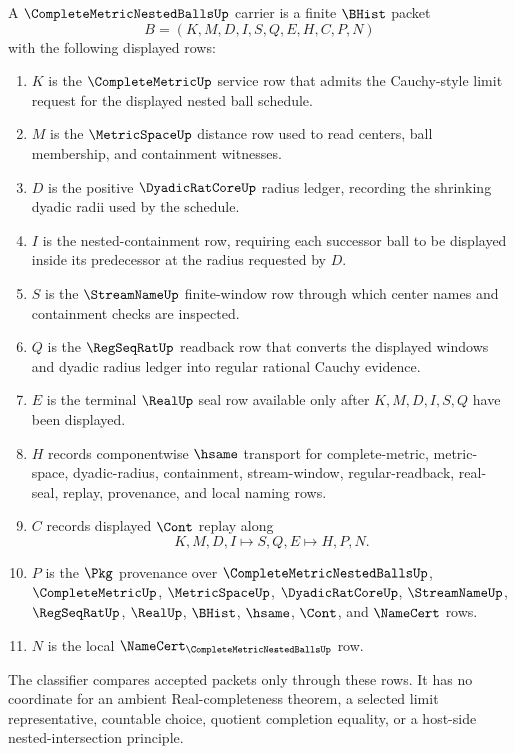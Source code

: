 \begin{definition}
\label{def:complete-metric-nested-balls-carrier}
A $\CompleteMetricNestedBallsUp$ carrier is a finite $\BHist$ packet
$$
B=(K,M,D,I,S,Q,E,H,C,P,N)
$$
with the following displayed rows:
\begin{enumerate}
\item $K$ is the $\CompleteMetricUp$ service row that admits the Cauchy-style limit request for the displayed nested ball schedule.
\item $M$ is the $\MetricSpaceUp$ distance row used to read centers, ball membership, and containment witnesses.
\item $D$ is the positive $\DyadicRatCoreUp$ radius ledger, recording the shrinking dyadic radii used by the schedule.
\item $I$ is the nested-containment row, requiring each successor ball to be displayed inside its predecessor at the radius requested by $D$.
\item $S$ is the $\StreamNameUp$ finite-window row through which center names and containment checks are inspected.
\item $Q$ is the $\RegSeqRatUp$ readback row that converts the displayed windows and dyadic radius ledger into regular rational Cauchy evidence.
\item $E$ is the terminal $\RealUp$ seal row available only after $K,M,D,I,S,Q$ have been displayed.
\item $H$ records componentwise $\hsame$ transport for complete-metric, metric-space, dyadic-radius, containment, stream-window, regular-readback, real-seal, replay, provenance, and local naming rows.
\item $C$ records displayed $\Cont$ replay along
$$
K,M,D,I \longmapsto S,Q,E \longmapsto H,P,N .
$$
\item $P$ is the $\Pkg$ provenance over $\CompleteMetricNestedBallsUp$, $\CompleteMetricUp$, $\MetricSpaceUp$, $\DyadicRatCoreUp$, $\StreamNameUp$, $\RegSeqRatUp$, $\RealUp$, $\BHist$, $\hsame$, $\Cont$, and $\NameCert$ rows.
\item $N$ is the local $\NameCert_{\CompleteMetricNestedBallsUp}$ row.
\end{enumerate}
The classifier compares accepted packets only through these rows. It has no coordinate for an ambient Real-completeness theorem, a selected limit representative, countable choice, quotient completion equality, or a host-side nested-intersection principle.
\end{definition}

